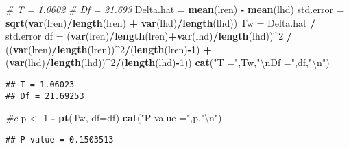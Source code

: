 \documentclass[]{article}
\newenvironment{Shaded}{\begin{snugshade}}{\end{snugshade}}
\newcommand{\CharTok}[1]{\textcolor[rgb]{0.31,0.60,0.02}{#1}}
\newcommand{\CommentTok}[1]{\textcolor[rgb]{0.56,0.35,0.01}{\textit{#1}}}
\newcommand{\DataTypeTok}[1]{\textcolor[rgb]{0.13,0.29,0.53}{#1}}
\newcommand{\DecValTok}[1]{\textcolor[rgb]{0.00,0.00,0.81}{#1}}
\newcommand{\KeywordTok}[1]{\textcolor[rgb]{0.13,0.29,0.53}{\textbf{#1}}}
\newcommand{\NormalTok}[1]{#1}
\newcommand{\OperatorTok}[1]{\textcolor[rgb]{0.81,0.36,0.00}{\textbf{#1}}}
\newcommand{\StringTok}[1]{\textcolor[rgb]{0.31,0.60,0.02}{#1}}
\begin{document}
\begin{Shaded}
\begin{Highlighting}[]
\CommentTok{# T = 1.0602}
\CommentTok{# Df = 21.693}
\NormalTok{Delta.hat =}\StringTok{ }\KeywordTok{mean}\NormalTok{(lren) }\OperatorTok{-}\StringTok{ }\KeywordTok{mean}\NormalTok{(lhd)}
\NormalTok{std.error =}\StringTok{ }\KeywordTok{sqrt}\NormalTok{(}\KeywordTok{var}\NormalTok{(lren)}\OperatorTok{/}\KeywordTok{length}\NormalTok{(lren) }\OperatorTok{+}\StringTok{ }\KeywordTok{var}\NormalTok{(lhd)}\OperatorTok{/}\KeywordTok{length}\NormalTok{(lhd))}
\NormalTok{Tw =}\StringTok{ }\NormalTok{Delta.hat }\OperatorTok{/}\StringTok{ }\NormalTok{std.error}
\NormalTok{df =}\StringTok{ }\NormalTok{(}\KeywordTok{var}\NormalTok{(lren)}\OperatorTok{/}\KeywordTok{length}\NormalTok{(lren)}\OperatorTok{+}\KeywordTok{var}\NormalTok{(lhd)}\OperatorTok{/}\KeywordTok{length}\NormalTok{(lhd))}\OperatorTok{^}\DecValTok{2} \OperatorTok{/}\StringTok{ }\NormalTok{((}\KeywordTok{var}\NormalTok{(lren)}\OperatorTok{/}\KeywordTok{length}\NormalTok{(lren))}\OperatorTok{^}\DecValTok{2}\OperatorTok{/}\NormalTok{(}\KeywordTok{length}\NormalTok{(lren)}\OperatorTok{-}\DecValTok{1}\NormalTok{) }\OperatorTok{+}\StringTok{ }\NormalTok{(}\KeywordTok{var}\NormalTok{(lhd)}\OperatorTok{/}\KeywordTok{length}\NormalTok{(lhd))}\OperatorTok{^}\DecValTok{2}\OperatorTok{/}\NormalTok{(}\KeywordTok{length}\NormalTok{(lhd)}\OperatorTok{-}\DecValTok{1}\NormalTok{))}
\KeywordTok{cat}\NormalTok{(}\StringTok{"T ="}\NormalTok{,Tw,}\StringTok{"}\CharTok{\textbackslash{}n}\StringTok{Df ="}\NormalTok{,df,}\StringTok{"}\CharTok{\textbackslash{}n}\StringTok{"}\NormalTok{)}
\end{Highlighting}
\end{Shaded}

\begin{verbatim}
## T = 1.06023 
## Df = 21.69253
\end{verbatim}

\begin{Shaded}
\begin{Highlighting}[]
\CommentTok{#c}
\NormalTok{p <-}\StringTok{ }\DecValTok{1} \OperatorTok{-}\StringTok{ }\KeywordTok{pt}\NormalTok{(Tw, }\DataTypeTok{df=}\NormalTok{df)}
\KeywordTok{cat}\NormalTok{(}\StringTok{"P-value ="}\NormalTok{,p,}\StringTok{"}\CharTok{\textbackslash{}n}\StringTok{"}\NormalTok{)}
\end{Highlighting}
\end{Shaded}

\begin{verbatim}
## P-value = 0.1503513
\end{verbatim}
\end{document}
